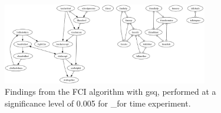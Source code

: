 \begin{figure}[htbp]
    \centering
    \includegraphics[width=0.8\textwidth]{Report/final_report/pictures/FCI_gsq_0.005__for time experiment.png}
    \caption{Findings from the FCI algorithm with gsq, performed at a significance level of 0.005 for _for time experiment.}
    \label{fig:fci_gsq_0.005_for time experiment}
\end{figure}
